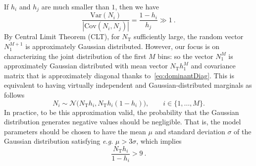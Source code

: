 \documentclass[journal]{IEEEtranTCOM}
\begin{document}
If $h_{i}$ and $h_{j}$ are much smaller than $1$, then we have
\begin{equation}
    \frac{\mathrm{Var}(N_i)}{|\mathrm{Cov}(N_i,N_j)|}=\frac{1-h_{i}}{h_{j}}\gg 1~.\label{eq:dominantDiag}
\end{equation}
By Central Limit Theorem (CLT), for $N_{\mathrm{T}}$ sufficiently large, the random vector $N_{1}^{M+1}$ is approximately Gaussian distributed. However, our focus is on characterizing the joint distribution of the first $M$ bins: so the vector $N_{1}^{M}$ is approximately Gaussian distributed with mean vector $N_{\mathrm{T}}h_{1}^{M}$ and covariance matrix that is approximately diagonal thanks to~\eqref{eq:dominantDiag}. This is equivalent to having virtually independent and Gaussian-distributed marginals as follows
\begin{equation}
N_i\sim\mathcal{N}\Big(N_{\mathrm{T}}h_{i},N_{\mathrm{T}}h_{i}(1-h_{i})\Big),\qquad i\in\{1,\ldots , M\}.
\end{equation}
In practice, to be this approximation valid, the probability that the Gaussian distribution generates negative values should be negligible. That is, the model parameters should be chosen to have the mean $\mu$ and standard deviation $\sigma$ of the Gaussian distribution satisfying \textit{e.g.}
$\mu>3\sigma$, which implies
\begin{equation}
    \frac{N_{\mathrm{T}}h_{i}}{1-h_{i}}>9~.\label{eq:valid_apx}
\end{equation}
\end{document}
